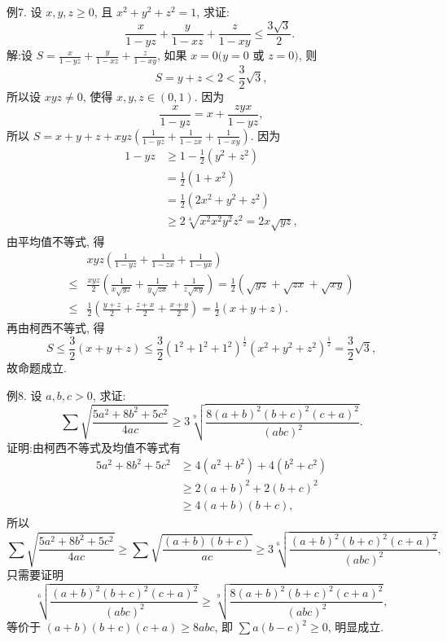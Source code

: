例7. 设 $x, y, z \geqslant 0$, 且 $x^2+y^2+z^2=1$, 求证:
$$
\frac{x}{1-y z}+\frac{y}{1-x z}+\frac{z}{1-x y} \leqslant \frac{3 \sqrt{3}}{2} \text {. }
$$
解:设 $S=\frac{x}{1-y z}+\frac{y}{1-x z}+\frac{z}{1-x y}$, 如果 $x=0(y=0$ 或 $z=0)$, 则
$$
S=y+z<2<\frac{3}{2} \sqrt{3},
$$
所以设 $x y z \neq 0$, 使得 $x, y, z \in(0,1)$. 因为
$$
\frac{x}{1-y z}=x+\frac{z y x}{1-y z},
$$
所以 $S=x+y+z+x y z\left(\frac{1}{1-y z}+\frac{1}{1-z x}+\frac{1}{1-x y}\right)$.
因为
$$
\begin{aligned}
1-y z & \geqslant 1-\frac{1}{2}\left(y^2+z^2\right) \\
& =\frac{1}{2}\left(1+x^2\right) \\
& =\frac{1}{2}\left(2 x^2+y^2+z^2\right) \\
& \geqslant 2 \sqrt[4]{x^2 x^2 y^2} z^2=2 x \sqrt{y z},
\end{aligned}
$$
由平均值不等式, 得
$$
\begin{aligned}
& x y z\left(\frac{1}{1-y z}+\frac{1}{1-z x}+\frac{1}{1-y x}\right) \\
\leqslant & \frac{x y z}{2}\left(\frac{1}{x \sqrt{y z}}+\frac{1}{y \sqrt{z x}}+\frac{1}{z \sqrt{x y}}\right)=\frac{1}{2}(\sqrt{y z}+\sqrt{z x}+\sqrt{x y}) \\
\leqslant & \frac{1}{2}\left(\frac{y+z}{2}+\frac{z+x}{2}+\frac{x+y}{2}\right)=\frac{1}{2}(x+y+z) .
\end{aligned}
$$
再由柯西不等式, 得
$$
S \leqslant \frac{3}{2}(x+y+z) \leqslant \frac{3}{2}\left(1^2+1^2+1^2\right)^{\frac{1}{2}}\left(x^2+y^2+z^2\right)^{\frac{1}{2}}=\frac{3}{2} \sqrt{3},
$$
故命题成立.



例8. 设 $a, b, c>0$, 求证:
$$
\sum \sqrt{\frac{5 a^2+8 b^2+5 c^2}{4 a c}} \geqslant 3 \sqrt[9]{\frac{8(a+b)^2(b+c)^2(c+a)^2}{(a b c)^2}} .
$$
证明:由柯西不等式及均值不等式有
$$
\begin{aligned}
5 a^2+8 b^2+5 c^2 & \geqslant 4\left(a^2+b^2\right)+4\left(b^2+c^2\right) \\
& \geqslant 2(a+b)^2+2(b+c)^2 \\
& \geqslant 4(a+b)(b+c),
\end{aligned}
$$
所以
$$
\sum \sqrt{\frac{5 a^2+8 b^2+5 c^2}{4 a c}} \geqslant \sum \sqrt{\frac{(a+b)(b+c)}{a c}} \geqslant 3 \sqrt[6]{\frac{(a+b)^2(b+c)^2(c+a)^2}{(a b c)^2}},
$$
只需要证明
$$
\sqrt[6]{\frac{(a+b)^2(b+c)^2(c+a)^2}{(a b c)^2}} \geqslant \sqrt[9]{\frac{8(a+b)^2(b+c)^2(c+a)^2}{(a b c)^2}},
$$
等价于 $(a+b)(b+c)(c+a) \geqslant 8 a b c$, 即 $\sum a(b-c)^2 \geqslant 0$, 明显成立.



